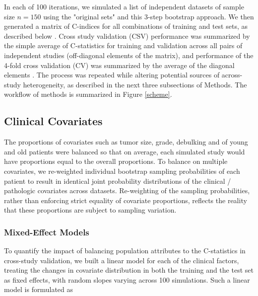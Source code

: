\documentclass{bioinfo}
\begin{document}
    In each of 100 iterations, we simulated a list of independent datasets of
    sample size $n=150$ using the "original sets" and this 3-step bootstrap approach.  We
    then generated a matrix of C-indices for all combinations of
    training and test sets, as described below
    \citep{Bernau2014}. %
    Cross study validation (CSV) performance was summarized by the
    simple average of C-statistics for training and validation across
    all pairs of independent studies (off-diagonal elements of the
    matrix), and performance of the 4-fold cross validation (CV) was summarized by the average
    of the diagonal elements \citep{Bernau2014}. The process was
    repeated while altering potential sources of across-study
    heterogeneity, as described in the next three subsections of
    Methods. The workflow of methods is summarized in Figure \ref{scheme}.



  \subsection{Clinical Covariates}

  The proportions of covariates such as tumor size, grade, debulking and of young and old
  patients were balanced so that on average, each simulated study would have
  proportions equal to the overall proportions.  To
  balance on multiple covariates, we re-weighted individual bootstrap
  sampling probabilities of each patient to result in identical joint
  probability distributions of the clinical / pathologic covariates
  across datasets.  Re-weighting of the sampling probabilities, rather
  than enforcing strict equality of covariate proportions, reflects
  the reality that these proportions are subject to sampling
  variation.

  	\subsubsection{Mixed-Effect Models}
  	To quantify the impact of balancing population attributes to the C-statistics
  	in cross-study validation, we built a linear model for each of the clinical factors, treating the
  	changes in covariate distribution in both the training and the test set 
  	as fixed effects, with random slopes varying across 100 simulations. 
  	Such a linear model is formulated as
  	
\end{document}
